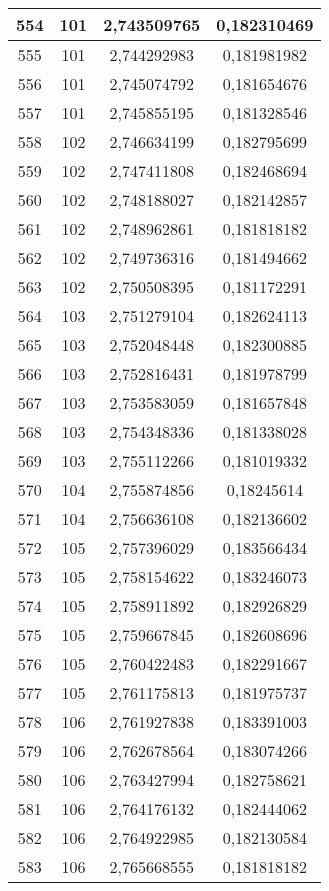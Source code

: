 {\begin{minipage}[!h]{0.45\textwidth}
\begin{longtable}{cccc}
554 & 101 & 2,743509765 & 0,182310469 \\ \hline
555 & 101 & 2,744292983 & 0,181981982 \\ \hline
556 & 101 & 2,745074792 & 0,181654676 \\ \hline
557 & 101 & 2,745855195 & 0,181328546 \\ \hline
558 & 102 & 2,746634199 & 0,182795699 \\ \hline
559 & 102 & 2,747411808 & 0,182468694 \\ \hline
560 & 102 & 2,748188027 & 0,182142857 \\ \hline
561 & 102 & 2,748962861 & 0,181818182 \\ \hline
562 & 102 & 2,749736316 & 0,181494662 \\ \hline
563 & 102 & 2,750508395 & 0,181172291 \\ \hline
564 & 103 & 2,751279104 & 0,182624113 \\ \hline
565 & 103 & 2,752048448 & 0,182300885 \\ \hline
566 & 103 & 2,752816431 & 0,181978799 \\ \hline
567 & 103 & 2,753583059 & 0,181657848 \\ \hline
568 & 103 & 2,754348336 & 0,181338028 \\ \hline
569 & 103 & 2,755112266 & 0,181019332 \\ \hline
570 & 104 & 2,755874856 & 0,18245614 \\ \hline
571 & 104 & 2,756636108 & 0,182136602 \\ \hline
572 & 105 & 2,757396029 & 0,183566434 \\ \hline
573 & 105 & 2,758154622 & 0,183246073 \\ \hline
574 & 105 & 2,758911892 & 0,182926829 \\ \hline
575 & 105 & 2,759667845 & 0,182608696 \\ \hline
576 & 105 & 2,760422483 & 0,182291667 \\ \hline
577 & 105 & 2,761175813 & 0,181975737 \\ \hline
578 & 106 & 2,761927838 & 0,183391003 \\ \hline
579 & 106 & 2,762678564 & 0,183074266 \\ \hline
580 & 106 & 2,763427994 & 0,182758621 \\ \hline
581 & 106 & 2,764176132 & 0,182444062 \\ \hline
582 & 106 & 2,764922985 & 0,182130584 \\ \hline
583 & 106 & 2,765668555 & 0,181818182 \\ \hline

\end{longtable}
\end{minipage}}
